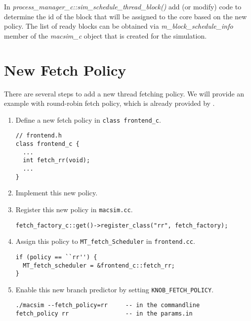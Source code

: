 In \textit{process\_manager\_c::sim\_schedule\_thread\_block()} add (or modify)
code to determine the id of the block that will be assigned to the core based
on the new policy. The list of ready blocks can be obtained via
\textit{m\_block\_schedule\_info} member of the \textit{macsim\_c} object that
is created for the simulation.


\section{New Fetch Policy}
\label{sec:modify:fetch}


There are several steps to add a new thread fetching policy. We will
provide an example with round-robin fetch policy, which is already
provided by \SIM.

\begin{enumerate}[Step 1.]
\item Define a new fetch policy in \Verb+class frontend_c+.
\begin{Verbatim}
// frontend.h
class frontend_c {
  ...
  int fetch_rr(void);
  ...
}
\end{Verbatim}

\item Implement this new policy.

\item Register this new policy in \Verb+macsim.cc+.
\begin{Verbatim}
fetch_factory_c::get()->register_class("rr", fetch_factory);
\end{Verbatim}


\item Assign this policy to \Verb+MT_fetch_Scheduler+ in \Verb+frontend.cc+.
\begin{Verbatim}
if (policy == ``rr'') {
  MT_fetch_scheduler = &frontend_c::fetch_rr;
}
\end{Verbatim}

\item Enable this new branch predictor by setting \Verb+KNOB_FETCH_POLICY+.
\begin{Verbatim}
./macsim --fetch_policy=rr     -- in the commandline
fetch_policy rr                -- in the params.in
\end{Verbatim}
\end{enumerate}


